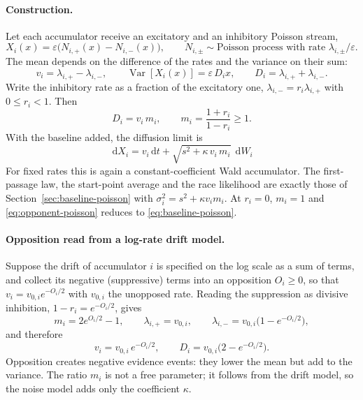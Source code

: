 \documentclass[12pt]{article}
\newcommand{\dd}{\,\mathrm{d}}
\begin{document}
\paragraph{Construction.}
Let each accumulator receive an excitatory and an inhibitory Poisson stream,
\begin{equation}
  X_i(x)=\varepsilon\big(N_{i,+}(x)-N_{i,-}(x)\big),
  \qquad
  N_{i,\pm}\sim\text{Poisson process with rate }\lambda_{i,\pm}/\varepsilon .
\end{equation}
The mean depends on the difference of the rates and the variance on their sum:
\begin{equation}
  v_i=\lambda_{i,+}-\lambda_{i,-},
  \qquad
  \operatorname{Var}[X_i(x)]=\varepsilon\,D_i x,
  \qquad
  D_i=\lambda_{i,+}+\lambda_{i,-}.
\end{equation}
Write the inhibitory rate as a fraction of the excitatory one, $\lambda_{i,-}=r_i\lambda_{i,+}$ with $0\le r_i<1$. Then
\begin{equation}
  D_i=v_i\,m_i,\qquad m_i=\frac{1+r_i}{1-r_i}\ge1 .
\end{equation}
With the baseline added, the diffusion limit is
\begin{equation}
  \boxed{\;\dd X_i=v_i\dd t+\sqrt{s^2+\kappa\,v_i\,m_i}\;\dd W_i\;}
  \label{eq:opponent-poisson}
\end{equation}
For fixed rates this is again a constant-coefficient Wald accumulator. The first-passage law, the start-point average and the race likelihood are exactly those of Section~\ref{sec:baseline-poisson} with $\sigma^2_i=s^2+\kappa v_im_i$. At $r_i=0$, $m_i=1$ and \eqref{eq:opponent-poisson} reduces to
\eqref{eq:baseline-poisson}.

\paragraph{Opposition read from a log-rate drift model.}
Suppose the drift of accumulator $i$ is specified on the log scale as a sum of terms, and collect its negative (suppressive) terms into an opposition $O_i\ge0$, so that $v_i=v_{0,i}e^{-O_i/2}$ with $v_{0,i}$ the unopposed rate. Reading the suppression as divisive inhibition, $1-r_i=e^{-O_i/2}$, gives
\begin{equation}
  m_i=2e^{O_i/2}-1,
  \qquad
  \lambda_{i,+}=v_{0,i},
  \qquad
  \lambda_{i,-}=v_{0,i}\big(1-e^{-O_i/2}\big),
\end{equation}
and therefore
\begin{equation}
  v_i=v_{0,i}\,e^{-O_i/2},
  \qquad
  D_i=v_{0,i}\big(2-e^{-O_i/2}\big).
\end{equation}
Opposition creates negative evidence events: they lower the mean but add to the variance. The ratio $m_i$ is not a free parameter; it follows from the drift model, so the noise model adds only the coefficient $\kappa$.
\end{document}
